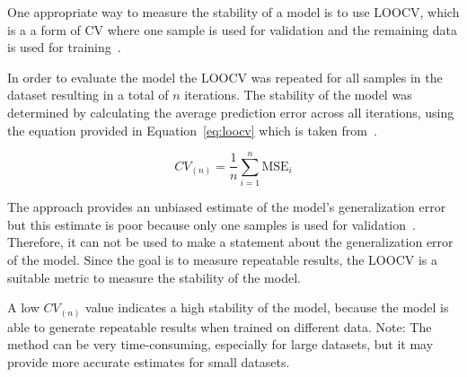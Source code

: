 One appropriate way to measure the stability of a model is to use \ac{LOOCV},
which is a
a form of \ac{CV} where one sample is used for validation and the remaining
data is
used for training~\cite[p. 200--201]{gareth2013introduction}.

In order to evaluate the model the \ac{LOOCV} was repeated for all samples in
the dataset
resulting in a total of $n$ iterations.
The stability of the model was determined by calculating the average
prediction error across all
iterations, using the equation provided in Equation~\ref{eq:loocv} which is
taken from~\cite[p.
201]{gareth2013introduction}.

\begin{tcolorbox}[arc=0pt,boxrule=0.5pt]
\begin{equation}
CV_{(n)} = \frac{1}{n} \sum_{i=1}^{n} \text{MSE}_{i}\label{eq:loocv}
\end{equation}
\end{tcolorbox}

The approach provides an unbiased estimate of the model's generalization error
but this estimate is poor because only one samples is used for
validation~\cite[p.
201]{gareth2013introduction}.
Therefore, it can not be used to make a statement about the generalization
error of the model.
Since the goal is to measure repeatable results, the \ac{LOOCV} is a suitable
metric to measure
the stability of the model.

%

A low $CV_{(n)}$ value indicates a high stability of the model, because the
model is able to
generate repeatable results when trained on different data.
Note: The method can be very time-consuming, especially for large datasets,
but it may provide
more accurate estimates for small datasets.



